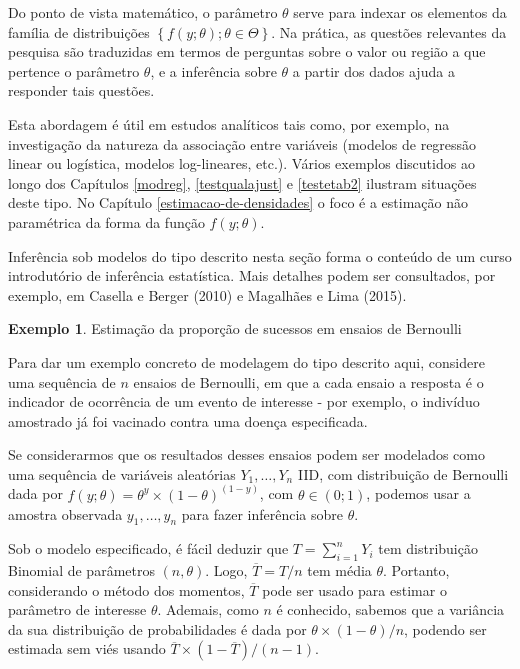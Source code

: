 \documentclass[
  12pt,
  brazilian,
]{book}
\theoremstyle{definition}
\theoremstyle{definition}
\newtheorem{example}{Exemplo}[chapter]
\theoremstyle{definition}
\theoremstyle{definition}
\theoremstyle{remark}
\begin{document}
Do ponto de vista matemático, o parâmetro \(\theta\) serve para indexar os
elementos da família de distribuições \(\left\{f\left( y;\theta \right);\theta \in \Theta \right\}\).
Na prática, as questões relevantes da pesquisa são traduzidas em termos de perguntas sobre o valor
ou região a que pertence o parâmetro \(\theta\), e a inferência sobre \(\theta\) a partir dos dados ajuda a responder tais questões.

Esta abordagem é útil em estudos analíticos tais como, por exemplo, na
investigação da natureza da associação entre variáveis (modelos de regressão
linear ou logística, modelos log-lineares, etc.). Vários exemplos discutidos ao
longo dos Capítulos \ref{modreg}, \ref{testqualajust} e \ref{testetab2}
ilustram situações deste tipo. No Capítulo \ref{estimacao-de-densidades} o foco é
a estimação não paramétrica da forma da função \(f(y;\theta)\).

Inferência sob modelos do tipo descrito nesta seção forma o conteúdo de um curso
introdutório de inferência estatística. Mais detalhes podem ser consultados, por
exemplo, em Casella e Berger (2010) e Magalhães e Lima (2015).

\begin{example}
\protect\hypertarget{exm:distbin}{}{\label{exm:distbin} }Estimação da proporção de sucessos em ensaios de Bernoulli
\end{example}
Para dar um exemplo concreto de modelagem do tipo descrito aqui, considere uma sequência
de \(n\) ensaios de Bernoulli, em que a cada ensaio a resposta é o indicador de ocorrência
de um evento de interesse - por exemplo, o indivíduo amostrado já foi vacinado contra uma doença especificada.

Se considerarmos que os resultados desses ensaios podem ser modelados como uma sequência de variáveis aleatórias \(Y_1, \ldots ,Y_n\) IID, com distribuição de Bernoulli dada por \(f(y;\theta)=\theta^y \times (1 - \theta)^{(1-y)}\), com \(\theta \in (0;1)\), podemos usar a amostra observada \(y_1, \ldots ,y_n\) para fazer inferência sobre \(\theta\).

Sob o modelo especificado, é fácil deduzir que \(T = \sum_{i=1}^n Y_i\) tem distribuição Binomial de parâmetros \((n, \theta)\). Logo, \(\overline{T} = T/n\) tem média \(\theta\). Portanto, considerando o método dos momentos, \(\overline{T}\) pode ser usado para estimar o parâmetro de interesse \(\theta\). Ademais, como \(n\) é conhecido, sabemos que a variância da sua distribuição de probabilidades é dada por \(\theta \times (1 - \theta) / n\), podendo ser estimada sem viés usando \(\overline{T} \times (1 - \overline{T}) / (n-1)\).
\end{document}
